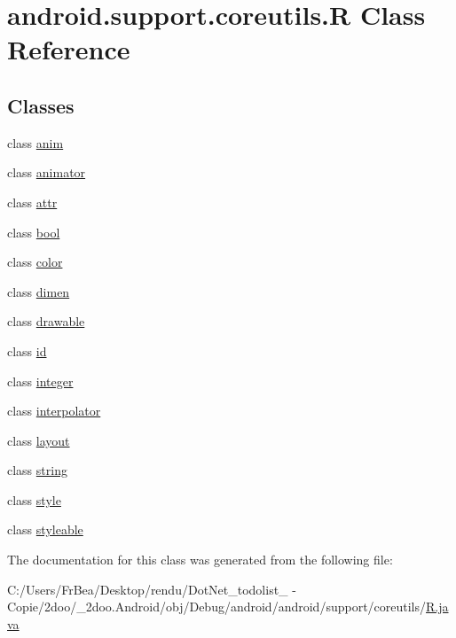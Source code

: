 \hypertarget{classandroid_1_1support_1_1coreutils_1_1_r}{
\section{android.support.coreutils.R Class Reference}
\label{classandroid_1_1support_1_1coreutils_1_1_r}
}
\subsection*{Classes}
\begin{CompactItemize}
\item 
class \hyperlink{classandroid_1_1support_1_1coreutils_1_1_r_1_1anim}{anim}
\item 
class \hyperlink{classandroid_1_1support_1_1coreutils_1_1_r_1_1animator}{animator}
\item 
class \hyperlink{classandroid_1_1support_1_1coreutils_1_1_r_1_1attr}{attr}
\item 
class \hyperlink{classandroid_1_1support_1_1coreutils_1_1_r_1_1bool}{bool}
\item 
class \hyperlink{classandroid_1_1support_1_1coreutils_1_1_r_1_1color}{color}
\item 
class \hyperlink{classandroid_1_1support_1_1coreutils_1_1_r_1_1dimen}{dimen}
\item 
class \hyperlink{classandroid_1_1support_1_1coreutils_1_1_r_1_1drawable}{drawable}
\item 
class \hyperlink{classandroid_1_1support_1_1coreutils_1_1_r_1_1id}{id}
\item 
class \hyperlink{classandroid_1_1support_1_1coreutils_1_1_r_1_1integer}{integer}
\item 
class \hyperlink{classandroid_1_1support_1_1coreutils_1_1_r_1_1interpolator}{interpolator}
\item 
class \hyperlink{classandroid_1_1support_1_1coreutils_1_1_r_1_1layout}{layout}
\item 
class \hyperlink{classandroid_1_1support_1_1coreutils_1_1_r_1_1string}{string}
\item 
class \hyperlink{classandroid_1_1support_1_1coreutils_1_1_r_1_1style}{style}
\item 
class \hyperlink{classandroid_1_1support_1_1coreutils_1_1_r_1_1styleable}{styleable}
\end{CompactItemize}


The documentation for this class was generated from the following file:\begin{CompactItemize}
\item 
C:/Users/FrBea/Desktop/rendu/DotNet\_\-todolist\_ - Copie/2doo/\_\-2doo.Android/obj/Debug/android/android/support/coreutils/\hyperlink{android_2support_2coreutils_2_r_8java}{R.java}\end{CompactItemize}
